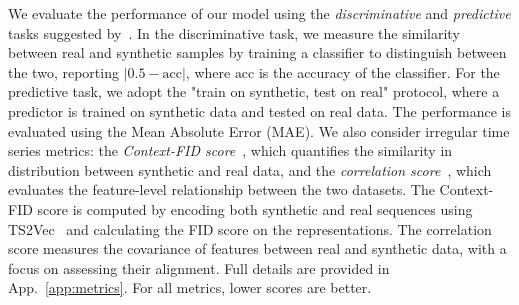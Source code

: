 \documentclass{article}
\theoremstyle{plain}
\theoremstyle{definition}
\theoremstyle{remark}
\begin{document}
We evaluate the performance of our model using the \emph{discriminative} and \emph{predictive} tasks suggested by~\cite{yoon2019time}. In the discriminative task, we measure the similarity between real and synthetic samples by training a classifier to distinguish between the two, reporting $|0.5 - \text{acc}|$, where $\text{acc}$ is the accuracy of the classifier. For the predictive task, we adopt the "train on synthetic, test on real" protocol, where a predictor is trained on synthetic data and tested on real data. The performance is evaluated using the Mean Absolute Error (MAE). We also consider irregular time series metrics: the \emph{Context-FID score}~\cite{jeha2022psa}, which quantifies the similarity in distribution between synthetic and real data, and the \emph{correlation score}~\cite{liao2020conditional}, which evaluates the feature-level relationship between the two datasets. The Context-FID score is computed by encoding both synthetic and real sequences using TS2Vec~\cite{yue2022ts2vec} and calculating the FID score on the representations. The correlation score measures the covariance of features between real and synthetic data, with a focus on assessing their alignment. Full details are provided in App.~\ref{app:metrics}. For all metrics, lower scores are better.
\end{document}
